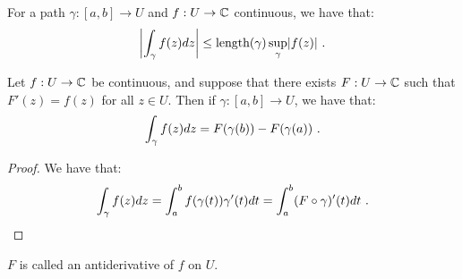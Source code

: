 \begin{proposition}
  For a path $\gamma : [a, b] \rightarrow U$ and $f : U \rightarrow \mathbb{C}$ continuous, we have that:
\[
\abs*{\int_\gamma f(z) dz} \leq \text{length}(\gamma) \sup_\gamma \abs*{f(z)} \mpunct{.}
\]
\end{proposition}

\begin{proposition}
  Let $f : U \rightarrow \mathbb{C}$ be continuous, and suppose that there exists $F : U \rightarrow \mathbb{C}$ such that $F'(z) = f(z)$ for all $z \in U$. Then if $\gamma : [a, b] \rightarrow U$, we have that:
\[
\int_\gamma f(z) dz = F(\gamma(b)) - F(\gamma(a)) \ \text{.}
\]
\end{proposition}

\begin{proof}
  We have that:
\[
\int_\gamma f(z) dz = \int_a^b f(\gamma(t))\gamma'(t) dt = \int_a^b(F \circ \gamma)'(t) dt \ \text{.}
\]
\end{proof}

$F$ is called an antiderivative of $f$ on $U$.


